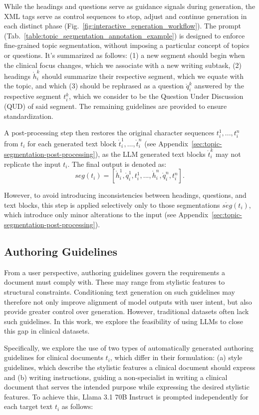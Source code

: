 While the headings and questions serve as guidance signals during generation, the XML tags serve as control sequences to stop, adjust and continue generation in each distinct phase  (Fig.~\ref{fig:interactive_generation_workflow}). The prompt (Tab.~\ref{table:topic_segmentation_annotation_example}) is designed to enforce fine-grained topic segmentation, without imposing a particular concept of topics or questions. It's summarized as follows: (1) a new segment should begin when the clinical focus changes, which we associate with a new writing subtask, (2) headings $\mathring{h}_i^k$ should summarize their respective segment, which we equate with the topic, and which (3) should be rephrased as a question $\mathring{q}_i^k$ answered by the respective segment $t_i^k$, which we consider to be the Question Under Discussion (QUD) of said segment. The remaining guidelines are provided to ensure standardization.

A post-processing step then restores the original character sequences $t_i^1, ..., t_i^n$ from $t_i$ for each generated text block $\mathring{t}_i^1, \dots, \mathring{t}_i^n$ (see Appendix~\ref{sec:topic-segmentation-post-processing}), as the LLM generated text blocks $\mathring{t}_i^k$ may not replicate the input $t_i$. The final output is denoted as: $$seg(t_i) = \left[
\mathring{h}_i^1, \mathring{q}_i^1, t_i^1, ..., \mathring{h}_i^n, \mathring{q}_i^n, t_i^n\right].$$

However, to avoid introducing inconsistencies between headings, questions, and text blocks, this step is applied selectively only to those segmentations $\mathring{seg}(t_i)$, which introduce only minor alterations to the input (see Appendix~\ref{sec:topic-segmentation-post-processing}).

\subsection{Authoring Guidelines}
\label{sec:authoring-guidelines}
From a user perspective, authoring guidelines govern the requirements a document must comply with. These may range from stylistic features to structural constraints. Conditioning text generation on such guidelines may therefore not only improve alignment of model outputs with user intent, but also provide greater control over generation. However, traditional datasets often lack such guidelines. In this work, we explore the feasibility of using LLMs to close this gap in clinical datasets.

Specifically, we explore the use of two types of automatically generated authoring guidelines for clinical documents $t_i$, which differ in their formulation: (a) style guidelines, which describe the stylistic features a clinical document should express and (b) writing instructions, guiding a non-specialist in writing a clinical document that serves the intended purpose while expressing the desired stylistic features. To achieve this, Llama 3.1 70B Instruct is prompted independently for each target text $t_i$ as follows:

